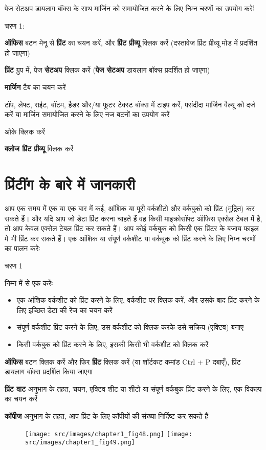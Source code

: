 पेज सेटअप डायलाग बॉक्स के साथ मार्जिन को समायोजित करने के लिए निम्न चरणों का उपयोग करेःं

\begin{descriptionSimple}{चरण 1:}
\item[चरण 1] \textbf{ऑफिस} बटन मेनू से \textbf{प्रिंट} का चयन करें, और \textbf{प्रिंट प्रीव्यू} क्लिक करें (दस्तावेज प्रिंट प्रीव्यू मोड में प्रदर्शित हो जाएगा)
\item[चरण 2] \textbf{प्रिंट} ग्रुप में, पेज \textbf{सेटअप} क्लिक करें (\textbf{पेज सेटअप} डायलाग बॉक्स प्रदर्शित हो जाएगा)
\item[चरण 3] \textbf{मार्जिन} टैब का चयन करें
\item[चरण 4] टॉप, लेफ्ट, राईट, बॉटम, हैडर और/या फूटर टेक्स्ट बॉक्स में टाइप करें, पसंदीदा मार्जिन वैल्यू को दर्ज करें या मार्जिन समायोजित करने के लिए नज बटनों का उपयोग करें
\item[चरण 5] ओके क्लिक करें
\item[चरण 6] \textbf{क्लोज प्रिंट प्रीव्यू} क्लिक करें
\end{descriptionSimple}

\section{प्रिंटींग के बारे में जानकारी}\label{id-1.25}

आप एक समय में एक या एक बार में कई, आंशिक या पूरी वर्कशीटो और वर्कबुको को प्रिंट (मुद्रित) कर सकते हैं। और यदि आप जो डेटा प्रिंट करना चाहते हैं वह किसी माइक्रोसॉफ्ट ऑफिस एक्सेल टेबल में है, तो आप केवल एक्सेल टेबल प्रिंट कर सकते हैं। आप कोई वर्कबुक को किसी एक प्रिंटर के बजाय फाइल मे भी प्रिंट कर सकते हैं। एक आंशिक या संपूर्ण वर्कशीट या वर्कबुक को प्रिंट करने के लिए निम्न चरणों का पालन करेः

\begin{descriptionSimple}{चरण 1}
\item[चरण 1] निम्न में से एक करेंः
			\begin{itemize}
			\item एक आंशिक वर्कशीट को प्रिंट करने के लिए, वर्कशीट पर क्लिक करें, और उसके बाद प्रिंट करने के लिए इच्छित डेटा की रेंज का चयन करें
			\item संपूर्ण वर्कशीट प्रिंट करने के लिए, उस वर्कशीट को क्लिक करके उसे सक्रिय (एक्टिव) बनाए
			\item किसी वर्कबुक को प्रिंट करने के लिए, इसकी किसी भी वर्कशीट को क्लिक करें
			\end{itemize}
\item[चरण 2] \textbf{ऑफिस} बटन क्लिक करें और फिर \textbf{प्रिंट} क्लिक करें (या शॉर्टकट कमांड  {\rm Ctrl + P}  दबाएँ), प्रिंट डायलाग बॉक्स प्रदर्शित किया जाएगा
\item[चरण 3] \textbf{प्रिंट वाट} अनुभाग के तहत, चयन, एक्टिव शीट या शीटो या संपूर्ण वर्कबुक प्रिंट करने के लिए, एक विकल्प का चयन करें
\item[चरण 4] \textbf{कॉपीज} अनुभाग के तहत, आप प्रिंट के लिए कॉपीयों की संख्या निर्दिष्ट कर सकते हैं
\end{descriptionSimple}
\begin{figure}[H]
\centering
\texttt{[image: src/images/chapter1\_fig48.png]}\qquad
\texttt{[image: src/images/chapter1\_fig49.png]}
\end{figure}
	
